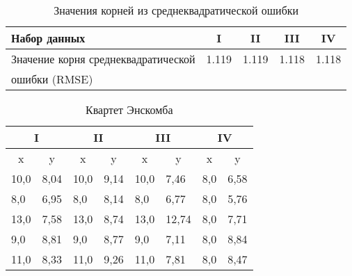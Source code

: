 	\begin{table}[!htp]
    	\centering
    	\caption{Значения корней из среднеквадратической ошибки}
		\begin{tabular}{|l|c|c|c|c|}
			\hline
			Набор данных                        & I     & II    & III   & IV    \\ \hline
			Значение корня среднеквадратической & 1.119 & 1.119 & 1.118 & 1.118 \\ 
			ошибки (RMSE)                       &       &       &       &       \\ \hline
		\end{tabular}
		\label{table:anscombe_quartet_rmse}
	\end{table}

    \begin{table}[!htp]
    	\centering
    	\caption{Квартет Энскомба}
		\begin{tabular}{|ll|ll|ll|ll|}
			\hline
			\multicolumn{2}{|c|}{I}                             & \multicolumn{2}{c|}{II}                            & \multicolumn{2}{c|}{III}                           & \multicolumn{2}{c|}{IV}                            \\ \hline
			\multicolumn{1}{|c|}{x}    & \multicolumn{1}{c|}{y} & \multicolumn{1}{c|}{x}    & \multicolumn{1}{c|}{y} & \multicolumn{1}{c|}{x}    & \multicolumn{1}{c|}{y} & \multicolumn{1}{c|}{x}    & \multicolumn{1}{c|}{y} \\ \hline
			\multicolumn{1}{|l|}{10,0} & 8,04                   & \multicolumn{1}{l|}{10,0} & 9,14                   & \multicolumn{1}{l|}{10,0} & 7,46                   & \multicolumn{1}{l|}{8,0}  & 6,58                   \\ \hline
			\multicolumn{1}{|l|}{8,0}  & 6,95                   & \multicolumn{1}{l|}{8,0}  & 8,14                   & \multicolumn{1}{l|}{8,0}  & 6,77                   & \multicolumn{1}{l|}{8,0}  & 5,76                   \\ \hline
			\multicolumn{1}{|l|}{13,0} & 7,58                   & \multicolumn{1}{l|}{13,0} & 8,74                   & \multicolumn{1}{l|}{13,0} & 12,74                  & \multicolumn{1}{l|}{8,0}  & 7,71                   \\ \hline
			\multicolumn{1}{|l|}{9,0}  & 8,81                   & \multicolumn{1}{l|}{9,0}  & 8,77                   & \multicolumn{1}{l|}{9,0}  & 7,11                   & \multicolumn{1}{l|}{8,0}  & 8,84                   \\ \hline
			\multicolumn{1}{|l|}{11,0} & 8,33                   & \multicolumn{1}{l|}{11,0} & 9,26                   & \multicolumn{1}{l|}{11,0} & 7,81                   & \multicolumn{1}{l|}{8,0}  & 8,47                   \\ \hline

\end{tabular}
\end{table}
